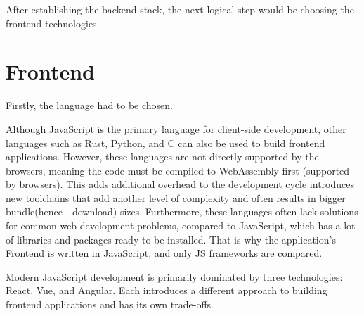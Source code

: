 After establishing the backend stack, the next logical step would be choosing the frontend technologies.


\section{Frontend}
Firstly, the language had to be chosen.

Although JavaScript is the primary language for client-side development,
other languages such as Rust, Python, and C can also be used to build frontend applications.
However, these languages are not directly supported by the browsers, meaning the code must be compiled to WebAssembly first (supported by browsers). This adds
additional overhead to the development cycle introduces new toolchains that add another level of
complexity and often results in bigger bundle(hence - download) sizes.
Furthermore, these languages often lack solutions for common web development problems,
compared to JavaScript, which has a lot of libraries and packages ready to be installed.
That is why the application's Frontend is written in JavaScript, and only JS frameworks are
compared.

Modern JavaScript development is primarily dominated by three technologies: React, Vue, and Angular.\cite{frameworkdata}
Each introduces a different approach to building frontend applications and has its own trade-offs.

